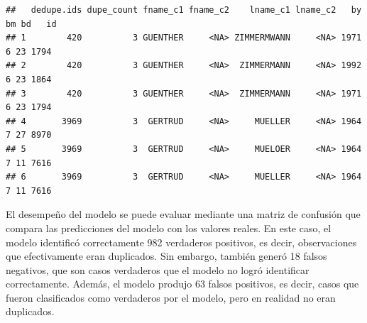 \documentclass[
  12pt,
]{book}
\newenvironment{Shaded}{\begin{snugshade}}{\end{snugshade}}
\newcommand{\AttributeTok}[1]{\textcolor[rgb]{0.13,0.29,0.53}{#1}}
\newcommand{\DecValTok}[1]{\textcolor[rgb]{0.00,0.00,0.81}{#1}}
\newcommand{\FunctionTok}[1]{\textcolor[rgb]{0.13,0.29,0.53}{\textbf{#1}}}
\newcommand{\NormalTok}[1]{#1}
\newcommand{\OtherTok}[1]{\textcolor[rgb]{0.56,0.35,0.01}{#1}}
\newcommand{\SpecialCharTok}[1]{\textcolor[rgb]{0.81,0.36,0.00}{\textbf{#1}}}
\begin{document}
\begin{verbatim}
##   dedupe.ids dupe_count fname_c1 fname_c2    lname_c1 lname_c2   by bm bd   id
## 1        420          3 GUENTHER     <NA> ZIMMERMWANN     <NA> 1971  6 23 1794
## 2        420          3 GUENTHER     <NA>  ZIMMERMANN     <NA> 1992  6 23 1864
## 3        420          3 GUENTHER     <NA>  ZIMMERMANN     <NA> 1971  6 23 1794
## 4       3969          3  GERTRUD     <NA>     MUELLER     <NA> 1964  7 27 8970
## 5       3969          3  GERTRUD     <NA>     MUELOER     <NA> 1964  7 11 7616
## 6       3969          3  GERTRUD     <NA>     MUELLER     <NA> 1964  7 11 7616
\end{verbatim}

El desempeño del modelo se puede evaluar mediante una matriz de confusión que compara las predicciones del modelo con los valores reales. En este caso, el modelo identificó correctamente 982 verdaderos positivos, es decir, observaciones que efectivamente eran duplicados. Sin embargo, también generó 18 falsos negativos, que son casos verdaderos que el modelo no logró identificar correctamente. Además, el modelo produjo 63 falsos positivos, es decir, casos que fueron clasificados como verdaderos por el modelo, pero en realidad no eran duplicados.

\begin{Shaded}
\end{Shaded}
\end{document}
